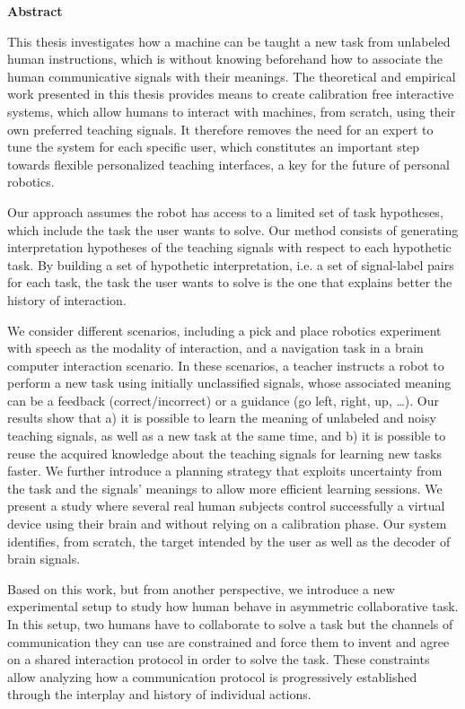 
\begin{vcenterpage}

\begin{center}
{\LARGE\textbf{Abstract}} 
\end{center}


This thesis investigates how a machine can be taught a new task from unlabeled human instructions, which is without knowing beforehand how to associate the human communicative signals with their meanings. The theoretical and empirical work presented in this thesis provides means to create calibration free interactive systems, which allow humans to interact with machines, from scratch, using their own preferred teaching signals. It therefore removes the need for an expert to tune the system for each specific user, which constitutes an important step towards flexible personalized teaching interfaces, a key for the future of personal robotics.

Our approach assumes the robot has access to a limited set of task hypotheses, which include the task the user wants to solve. Our method consists of generating interpretation hypotheses of the teaching signals with respect to each hypothetic task. By building a set of hypothetic interpretation, i.e. a set of signal-label pairs for each task, the task the user wants to solve is the one that explains better the history of interaction.

We consider different scenarios, including a pick and place robotics experiment with speech as the modality of interaction, and a navigation task in a brain computer interaction scenario. In these scenarios, a teacher instructs a robot to perform a new task using initially unclassified signals, whose associated meaning can be a feedback (correct/incorrect) or a guidance (go left, right, up, \ldots). Our results show that a) it is possible to learn the meaning of unlabeled and noisy teaching signals, as well as a new task at the same time, and b) it is possible to reuse the acquired knowledge about the teaching signals for learning new tasks faster. We further introduce a planning strategy that exploits uncertainty from the task and the signals' meanings to allow more efficient learning sessions. We present a study where several real human subjects control successfully a virtual device using their brain and without relying on a calibration phase. Our system identifies, from scratch, the target intended by the user as well as the decoder of brain signals.

Based on this work, but from another perspective, we introduce a new experimental setup to study how human behave in asymmetric collaborative task. In this setup, two humans have to collaborate to solve a task but the channels of communication they can use are constrained and force them to invent and agree on a shared interaction protocol in order to solve the task. These constraints allow analyzing how a communication protocol is progressively established through the interplay and history of individual actions.


\end{vcenterpage}